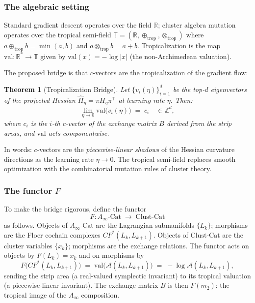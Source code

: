 \documentclass[11pt]{amsart}
\newtheorem{theorem}{Theorem}[section]
\begin{document}
\subsubsection*{The algebraic setting}

Standard gradient descent operates over the field $\mathbb{R}$;
cluster algebra mutation operates over the tropical semi-field
$\mathbb{T} = (\mathbb{R}, \oplus_\mathrm{trop}, \otimes_\mathrm{trop})$
where $a \oplus_\mathrm{trop} b = \min(a,b)$ and
$a \otimes_\mathrm{trop} b = a + b$.
Tropicalization is the map $\mathrm{val}: \mathbb{R}^* \to \mathbb{T}$
given by $\mathrm{val}(x) = -\log|x|$ (the non-Archimedean valuation).

The proposed bridge is that $c$-vectors are the tropicalization of the
gradient flow:

\begin{theorem}[Tropicalization Bridge]
\label{thm:trop_bridge}
Let $\{v_i(\eta)\}_{i=1}^d$ be the top-$d$ eigenvectors of the
projected Hessian $\hat{H}_\eta = \pi H_\eta \pi^\top$ at
learning rate $\eta$.
Then:
\[
  \lim_{\eta \to 0} \mathrm{val}\bigl(v_i(\eta)\bigr)
  \;=\; c_i \quad \in \mathbb{Z}^d,
\]
where $c_i$ is the $i$-th $c$-vector of the exchange matrix $B$
derived from the strip areas, and $\mathrm{val}$ acts
componentwise.
\end{theorem}

\noindent
In words: $c$-vectors are the \emph{piecewise-linear shadows} of the
Hessian curvature directions as the learning rate $\eta \to 0$.
The tropical semi-field replaces smooth optimization with
the combinatorial mutation rules of cluster theory.

\subsubsection*{The functor $F$}

To make the bridge rigorous, define the functor
\[
  F: A_\infty\text{-Cat} \;\longrightarrow\; \mathrm{Clust\text{-}Cat}
\]
as follows.
Objects of $A_\infty\text{-Cat}$ are the Lagrangian submanifolds
$\{L_k\}$; morphisms are the Floer cochain complexes $CF^*(L_k, L_{k+1})$.
Objects of $\mathrm{Clust\text{-}Cat}$ are the cluster variables
$\{x_k\}$; morphisms are the exchange relations.
The functor acts on objects by $F(L_k) = x_k$ and on morphisms by
\[
  F\bigl(CF^*(L_k, L_{k+1})\bigr)
  \;=\; \mathrm{val}\bigl(\mathcal{A}(L_k, L_{k+1})\bigr)
  \;=\; -\log\mathcal{A}(L_k, L_{k+1}),
\]
sending the strip area (a real-valued symplectic invariant) to its
tropical valuation (a piecewise-linear invariant).
The exchange matrix $B$ is then $F(m_2)$: the tropical image of the
$A_\infty$ composition.
\end{document}
